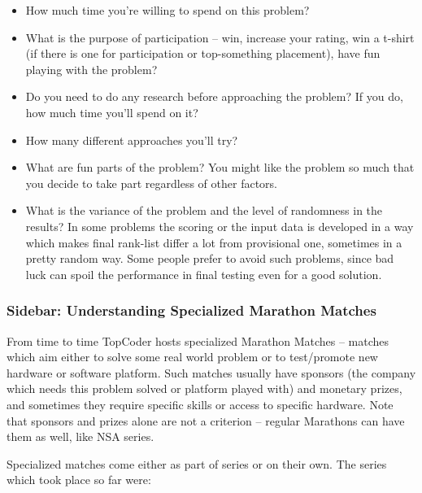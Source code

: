 \documentclass[]{article}
\begin{document}
\begin{itemize}
\item
  How much time you're willing to spend on this problem?
\item
  What is the purpose of participation -- win, increase your rating, win
  a t-shirt (if there is one for participation or top-something
  placement), have fun playing with the problem?
\item
  Do you need to do any research before approaching the problem? If you
  do, how much time you'll spend on it?
\item
  How many different approaches you'll try?
\item
  What are fun parts of the problem? You might like the problem so much
  that you decide to take part regardless of other factors.
\item
  What is the variance of the problem and the level of randomness in the
  results? In some problems the scoring or the input data is developed
  in a way which makes final rank-list differ a lot from provisional
  one, sometimes in a pretty random way. Some people prefer to avoid
  such problems, since bad luck can spoil the performance in final
  testing even for a good solution.
\end{itemize}

\hypertarget{sidebar-understanding-specialized-marathon-matches}{%
\subsubsection{Sidebar: Understanding Specialized Marathon
Matches}\label{sidebar-understanding-specialized-marathon-matches}}

From time to time TopCoder hosts specialized Marathon Matches -- matches
which aim either to solve some real world problem or to test/promote new
hardware or software platform. Such matches usually have sponsors (the
company which needs this problem solved or platform played with) and
monetary prizes, and sometimes they require specific skills or access to
specific hardware. Note that sponsors and prizes alone are not a
criterion -- regular Marathons can have them as well, like NSA series.

Specialized matches come either as part of series or on their own. The
series which took place so far were:
\end{document}
